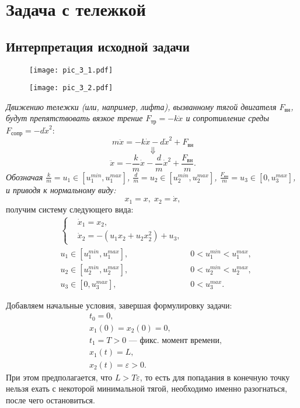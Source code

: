 \chapter*{Задача с тележкой}

\section*{Интерпретация исходной задачи}

\begin{figure}[h!]
    \centering
    \begin{minipage}{.6\textwidth}
        \centering
        \texttt{[image: pic\_3\_1.pdf]}
    \end{minipage}%
    \begin{minipage}{.4\textwidth}
        \texttt{[image: pic\_3\_2.pdf]}
    \end{minipage}
\end{figure}

\textit{Движению тележки (или, например, лифта), вызванному тягой двигателя $F_{\text{вн}}$, будут препятствовать вязкое трение $F_{\text{тр}} = -k \dot{x}$ и сопротивление среды $F_{\text{сопр}} = -d\dot{x}^2$}:
$$
    m \ddot{x} = -k\dot{x} - d \dot{x}^2 + F_{\text{вн}}
$$
$$
    \Downarrow
$$
$$
    \ddot{x} = -\frac{k}{m} \dot{x} - \frac{d}{m} \dot{x}^2 + \frac{F_{\text{вн}}}{m}.
$$
\textit{Обозначая $\frac{k}{m} = u_1 \in [u_1^{min}, u_1^{max}]$, $\frac{d}{m} = u_2 \in [u_2^{min}, u_2^{max}]$, $\frac{F_{\text{вн}}}{m} = u_3 \in [0, u_3^{max}]$, и приводя к нормальному виду:}
$$
    x_1 = x, \; x_2 = \dot{x},
$$
получим систему следующего вида:
$$
    \begin{aligned}
        & \left\{
            \begin{aligned}
                & \dot{x}_1 = x_2, \\
                & \dot{x}_2 = - (u_1x_2 + u_2 x_2^2) + u_3,
            \end{aligned}
        \right.\\
        & u_1 \in [u_1^{min}, u_1^{max}], & 0 < u_1^{min} < u_1^{max}, \\
        & u_2 \in [u_2^{min}, u_2^{max}], & 0 < u_2^{min} < u_2^{max}, \\
        & u_3 \in [0, u_3^{max}],         & 0 < u_3^{max}.
    \end{aligned}
$$

Добавляем начальные условия, завершая формулировку задачи:
$$
\begin{aligned}
    & t_0 = 0, \\
    & x_1 (0) = x_2 (0) = 0, \\
    & t_1 = T > 0 \text{ --- фикс. момент времени}, \\
    & x_1(t) = L, \\
    & x_2(t) = \varepsilon > 0.
\end{aligned}
$$
При этом предполагается, что $L > T \varepsilon$, то есть для попадания в конечную точку нельзя ехать с некоторой минимальной тягой, необходимо именно разогнаться, после чего остановиться.

